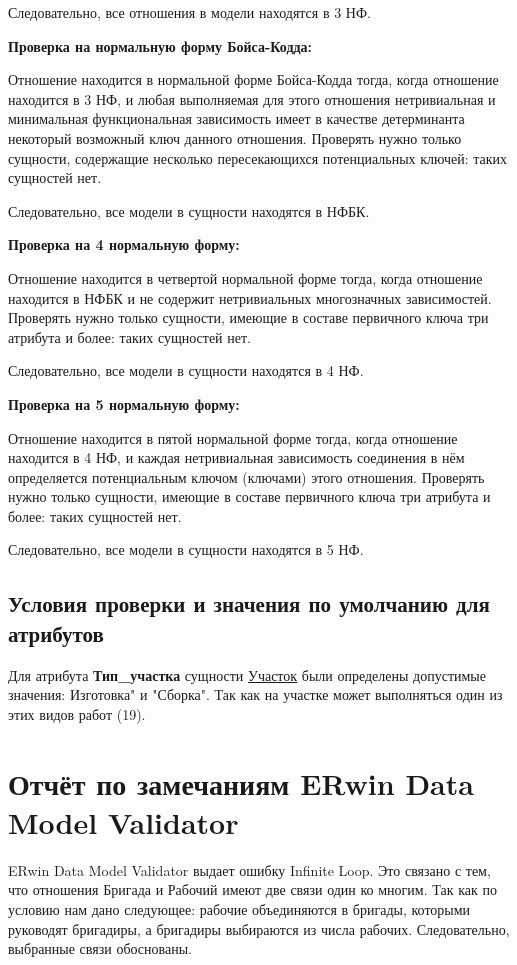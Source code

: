 Следовательно, все отношения в модели находятся в 3 НФ.

{\bf Проверка на нормальную форму Бойса-Кодда:}

Отношение находится в нормальной форме Бойса-Кодда тогда, когда отношение находится в 3 НФ, и любая выполняемая для этого отношения нетривиальная и минимальная функциональная зависимость имеет в качестве детерминанта некоторый возможный ключ данного отношения.
Проверять нужно только сущности, содержащие несколько пересекающихся потенциальных ключей: таких сущностей нет.

Следовательно, все модели в сущности находятся в НФБК.

{\bf Проверка на 4 нормальную форму:}

Отношение находится в четвертой нормальной форме тогда, когда отношение находится в НФБК и не содержит нетривиальных многозначных зависимостей.
Проверять нужно только сущности, имеющие в составе первичного ключа три атрибута и более: таких сущностей нет.

Следовательно, все модели в сущности находятся в 4 НФ.

{\bf Проверка на 5 нормальную форму:}

Отношение находится в пятой нормальной форме тогда, когда отношение находится в 4 НФ, и каждая нетривиальная зависимость соединения в нём определяется потенциальным ключом (ключами) этого отношения.
Проверять нужно только сущности, имеющие в составе первичного ключа три атрибута и более: таких сущностей нет.

Следовательно, все модели в сущности находятся в 5 НФ.

\subsection{Условия проверки и значения по умолчанию для атрибутов}

Для атрибута {\bf Тип\_участка} сущности \underline{Участок} были определены допустимые значения: Изготовка" и "Сборка".
Так как на участке может выполняться один из этих видов работ (19).


\section {Отчёт по замечаниям ERwin Data Model Validator}

ERwin Data Model Validator выдает ошибку Infinite Loop.
Это связано с тем, что отношения Бригада и Рабочий имеют две связи один ко многим.
Так как по условию нам дано следующее: рабочие объединяются в бригады, которыми руководят бригадиры, а бригадиры выбираются из числа рабочих.
Следовательно, выбранные связи обоснованы.

